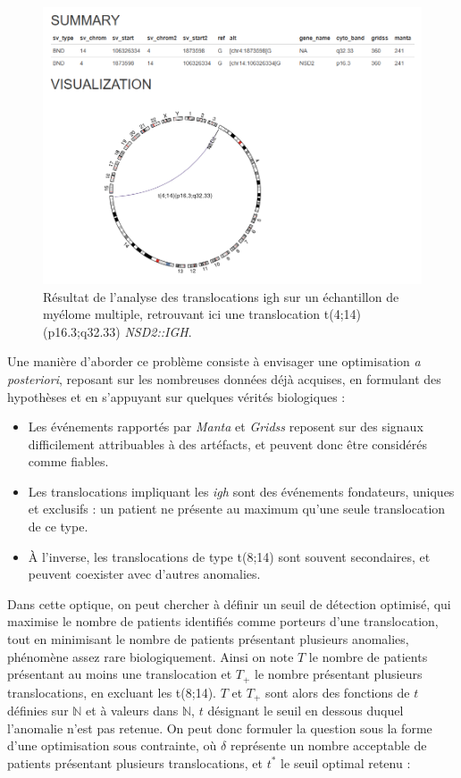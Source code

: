 \begin{figure}[H]
    \centering
    \includegraphics[width=1\textwidth]{images/translocation_web.png}
    \caption{
        Résultat de l'analyse des translocations \gls{igh} sur un échantillon de myélome multiple, 
        retrouvant ici une translocation t(4;14)(p16.3;q32.33) \textit{NSD2::IGH}.
        }
    \label{fig:translocation-web}
\end{figure}

Une manière d'aborder ce problème consiste à envisager une optimisation \textit{a posteriori}, reposant sur les nombreuses données déjà acquises, 
en formulant des hypothèses et en s'appuyant sur quelques vérités biologiques :

\begin{itemize}
    \item Les événements rapportés par \textit{Manta} et \textit{Gridss} reposent sur des signaux difficilement attribuables à des artéfacts, et peuvent donc être considérés comme fiables.
    \item Les translocations impliquant les \textit{\gls{igh}} sont des événements fondateurs, uniques et exclusifs : un patient ne présente au maximum qu'une seule translocation de ce type.
    \item À l'inverse, les translocations de type t(8;14) sont souvent secondaires, et peuvent coexister avec d'autres anomalies.
\end{itemize}

\vspace{1em}

Dans cette optique, on peut chercher à définir un seuil de détection optimisé, qui maximise le nombre de patients identifiés comme porteurs d'une translocation, 
tout en minimisant le nombre de patients présentant plusieurs anomalies, phénomène assez rare biologiquement. Ainsi on note $T$ le nombre de patients 
présentant au moins une translocation et $T_{+}$ le nombre présentant plusieurs translocations, en excluant les t(8;14). $T$ et $T_{+}$ sont alors des fonctions 
de $t$ définies sur $\mathbb{N}$ et à valeurs dans $\mathbb{N}$, $t$ désignant le seuil en dessous duquel l'anomalie n'est pas retenue. On peut donc formuler la question sous la forme d'une optimisation sous contrainte, 
où $\delta$ représente un nombre acceptable de patients présentant plusieurs translocations, et $t^*$ le seuil optimal retenu :

